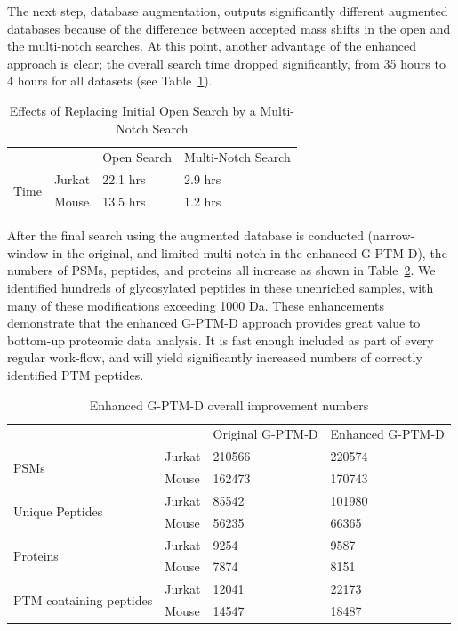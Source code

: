 \documentclass[journal=jprobs,manuscript=article]{achemso}
\begin{document}
The next step, database augmentation, outputs significantly different augmented databases because of the difference between accepted mass shifts in the open and the multi-notch searches.
At this point, another advantage of the enhanced approach is clear; the overall search time dropped significantly, from 35 hours to 4 hours for all datasets (see Table~\ref{my-labelff}).

\begin{table}[]
\centering
\caption{Effects of Replacing Initial Open Search by a Multi-Notch Search}
\label{my-labelff}
\begin{tabular}{ll|l|l}
                      &        & Open Search & Multi-Notch Search\\
\multirow{2}{*}{Time} & Jurkat & 22.1 hrs         & 2.9 hrs    \\
                      & Mouse  & 13.5 hrs         & 1.2 hrs   \\
\end{tabular}
\end{table}

After the final search using the augmented database is conducted (narrow-window in the original, and limited multi-notch in the enhanced G-PTM-D), the numbers of PSMs, peptides, and proteins all increase as shown in Table~\ref{tab:table2}.
We identified hundreds of glycosylated peptides in these unenriched samples, with many of these modifications exceeding 1000 Da.
These enhancements demonstrate that the enhanced G-PTM-D approach provides great value to bottom-up proteomic data analysis.
It is fast enough included as part of every regular work-flow, and will yield significantly increased numbers of correctly identified PTM peptides.

\begin{table}[]
\centering
\caption{Enhanced G-PTM-D overall improvement numbers}
\label{tab:table2}
\begin{tabular}{llll}
                      &        & Original G-PTM-D & Enhanced G-PTM-D\\
\multirow{2}{*}{PSMs} & Jurkat  & 210566   &  220574  \\
                      & Mouse    & 162473   &   170743 \\
\multirow{2}{*}{Unique Peptides} & Jurkat  & 85542   &  101980  \\
                      & Mouse    & 56235   &   66365 \\
\multirow{2}{*}{Proteins} & Jurkat  & 9254   &  9587  \\
                      & Mouse    & 7874   &   8151 \\
\multirow{2}{*}{PTM containing peptides} & Jurkat  & 12041   &  22173  \\
                      & Mouse    & 14547   &   18487 \\
\end{tabular}
\end{table}
\end{document}

